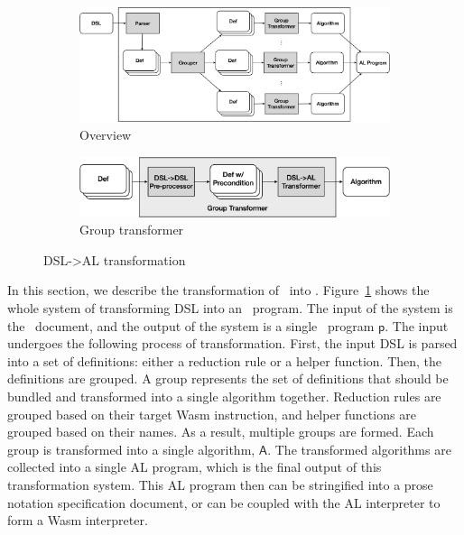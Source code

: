 \begin{figure}
  \centering
  \begin{subfigure}[b]{0.9\textwidth}
    \includegraphics[width=\textwidth]{img/trans1}
    \caption{Overview}
    \label{fig:overview}
  \end{subfigure}
  \hfill
  \begin{subfigure}[b]{0.9\textwidth}
    \includegraphics[width=\textwidth]{img/trans2}
    \caption{Group transformer}
    \label{fig:grouptrans}
  \end{subfigure}
  \caption{DSL->AL transformation}
  \label{fig:trans}
\end{figure}

In this section, we describe the transformation of \dsl~into \al.
Figure~\ref{fig:overview} shows the whole system of transforming DSL into an \al~program.
The input of the system is the \dsl~document,
and the output of the system is a single \al~program $\mathsf{p}$.
The input undergoes the following process of transformation.
First, the input DSL is parsed into a set of definitions: either a reduction rule or a
helper function. Then, the definitions are grouped.
A group represents the set of definitions that should be bundled and transformed
into a single algorithm together.
Reduction rules are grouped based on
their target Wasm instruction, and helper functions are grouped based on their names.
As a result, multiple groups are formed. Each group is transformed into a single algorithm,
$\mathsf{A}$. The transformed algorithms are collected into a single AL program, which is the
final output of this transformation system. This AL program then can be stringified into a
prose notation specification document, or can be coupled with the AL interpreter to form a Wasm interpreter.


